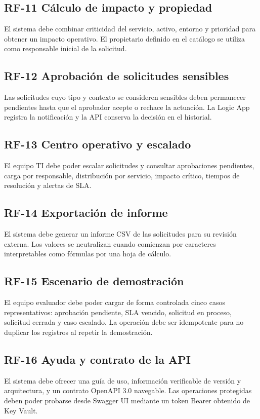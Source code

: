 \subsection{RF-11 Cálculo de impacto y propiedad}
El sistema debe combinar criticidad del servicio, activo, entorno y prioridad para obtener un impacto operativo. El propietario definido en el catálogo se utiliza como responsable inicial de la solicitud.

\subsection{RF-12 Aprobación de solicitudes sensibles}
Las solicitudes cuyo tipo y contexto se consideren sensibles deben permanecer pendientes hasta que el aprobador acepte o rechace la actuación. La Logic App registra la notificación y la API conserva la decisión en el historial.

\subsection{RF-13 Centro operativo y escalado}
El equipo TI debe poder escalar solicitudes y consultar aprobaciones pendientes, carga por responsable, distribución por servicio, impacto crítico, tiempos de resolución y alertas de SLA.

\subsection{RF-14 Exportación de informe}
El sistema debe generar un informe CSV de las solicitudes para su revisión externa. Los valores se neutralizan cuando comienzan por caracteres interpretables como fórmulas por una hoja de cálculo.

\subsection{RF-15 Escenario de demostración}
El equipo evaluador debe poder cargar de forma controlada cinco casos representativos: aprobación pendiente, SLA vencido, solicitud en proceso, solicitud cerrada y caso escalado. La operación debe ser idempotente para no duplicar los registros al repetir la demostración.

\subsection{RF-16 Ayuda y contrato de la API}
El sistema debe ofrecer una guía de uso, información verificable de versión y arquitectura, y un contrato OpenAPI 3.0 navegable. Las operaciones protegidas deben poder probarse desde Swagger UI mediante un token Bearer obtenido de Key Vault.

